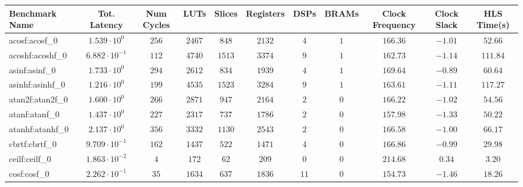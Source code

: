 \begin{tabular}{|l|c|c|c|c|c|c|c|c|c|c|}
\hline
Benchmark Name               & Tot. Latency            & Num Cycles & LUTs      & Slices    & Registers & DSPs    & BRAMs & Clock Frequency & Clock Slack & HLS Time(s) \\
\hline
acosf:acosf\_0               & $ 1.539 \cdot 10^{0}  $ & $ 256    $ & $ 2467  $ & $ 848   $ & $ 2132  $ & $ 4   $ & $ 1 $ & $ 166.36      $ & $ -1.01   $ & $ 52.66   $ \\
acoshf:acoshf\_0             & $ 6.882 \cdot 10^{-1} $ & $ 112    $ & $ 4740  $ & $ 1513  $ & $ 3374  $ & $ 9   $ & $ 1 $ & $ 162.73      $ & $ -1.14   $ & $ 111.84  $ \\
asinf:asinf\_0               & $ 1.733 \cdot 10^{0}  $ & $ 294    $ & $ 2612  $ & $ 834   $ & $ 1939  $ & $ 4   $ & $ 1 $ & $ 169.64      $ & $ -0.89   $ & $ 60.64   $ \\
asinhf:asinhf\_0             & $ 1.216 \cdot 10^{0}  $ & $ 199    $ & $ 4535  $ & $ 1523  $ & $ 3284  $ & $ 9   $ & $ 1 $ & $ 163.61      $ & $ -1.11   $ & $ 117.27  $ \\
atan2f:atan2f\_0             & $ 1.600 \cdot 10^{0}  $ & $ 266    $ & $ 2871  $ & $ 947   $ & $ 2164  $ & $ 2   $ & $ 0 $ & $ 166.22      $ & $ -1.02   $ & $ 54.56   $ \\
atanf:atanf\_0               & $ 1.437 \cdot 10^{0}  $ & $ 227    $ & $ 2317  $ & $ 737   $ & $ 1786  $ & $ 2   $ & $ 0 $ & $ 157.98      $ & $ -1.33   $ & $ 50.22   $ \\
atanhf:atanhf\_0             & $ 2.137 \cdot 10^{0}  $ & $ 356    $ & $ 3332  $ & $ 1130  $ & $ 2543  $ & $ 2   $ & $ 0 $ & $ 166.58      $ & $ -1.00   $ & $ 66.17   $ \\
cbrtf:cbrtf\_0               & $ 9.709 \cdot 10^{-1} $ & $ 162    $ & $ 1437  $ & $ 522   $ & $ 1471  $ & $ 4   $ & $ 0 $ & $ 166.86      $ & $ -0.99   $ & $ 29.98   $ \\
ceilf:ceilf\_0               & $ 1.863 \cdot 10^{-2} $ & $ 4      $ & $ 172   $ & $ 62    $ & $ 209   $ & $ 0   $ & $ 0 $ & $ 214.68      $ & $ 0.34    $ & $ 3.20    $ \\
cosf:cosf\_0                 & $ 2.262 \cdot 10^{-1} $ & $ 35     $ & $ 1634  $ & $ 637   $ & $ 1836  $ & $ 11  $ & $ 0 $ & $ 154.73      $ & $ -1.46   $ & $ 18.26   $ \\

\end{tabular}
